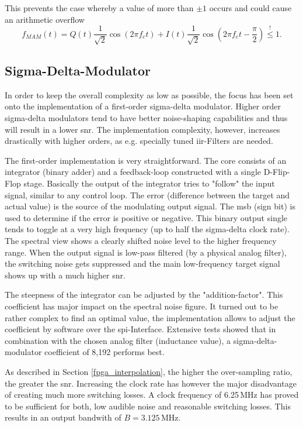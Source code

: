 This prevents the case whereby a value of more than $\pm 1$ occurs and could cause an arithmetic overflow
\begin{equation}
    f_{MAM}(t) = Q(t)\frac{1}{\sqrt{2}}\cos(2\pi f_c t) + I(t)\frac{1}{\sqrt{2}}\cos(2\pi f_c t - \frac{\pi}{2})  \overset{!}{\leq} 1.
\end{equation}

\subsection{Sigma-Delta-Modulator}
In order to keep the overall complexity as low as possible, the focus has been set onto the implementation of a first-order sigma-delta modulator. Higher order sigma-delta modulators tend to have better noise-shaping capabilities and thus will result in a lower \acrshort{snr}. The implementation complexity, however, increases drastically with higher orders, as e.g. specially tuned \acrshort{iir}-Filters are needed.

The first-order implementation is very straightforward. The core consists of an integrator (binary adder) and a feedback-loop constructed with a single D-Flip-Flop stage. Basically the output of the integrator tries to "follow" the input signal, similar to any control loop. The error (difference between the target and actual value) is the source of the modulating output signal. The \acrshort{msb} (sign bit) is used to determine if the error is positive or negative. This binary output single tends to toggle at a very high frequency (up to half the sigma-delta clock rate). The spectral view shows a clearly shifted noise level to the higher frequency range. When the output signal is low-pass filtered (by a physical analog filter), the switching noise gets suppressed and the main low-frequency target signal shows up with a much higher \acrshort{snr}.

The steepness of the integrator can be adjusted by the "addition-factor". This coefficient has major impact on the spectral noise figure. It turned out to be rather complex to find an optimal value, the implementation allows to adjust the coefficient by software over the \acrshort{spi}-Interface. Extensive tests showed that in combination with the chosen analog filter (inductance value), a sigma-delta-modulator coefficient of 8,192 performs best.

As described in Section \ref{fpga_interpolation}, the higher the over-sampling ratio, the greater the \acrshort{snr}. Increasing the clock rate has however the major disadvantage of creating much more switching losses. A clock frequency of 6.25\,MHz has proved to be sufficient for both, low audible noise and reasonable switching losses. This results in an output bandwith of $B=3.125$\,MHz.

